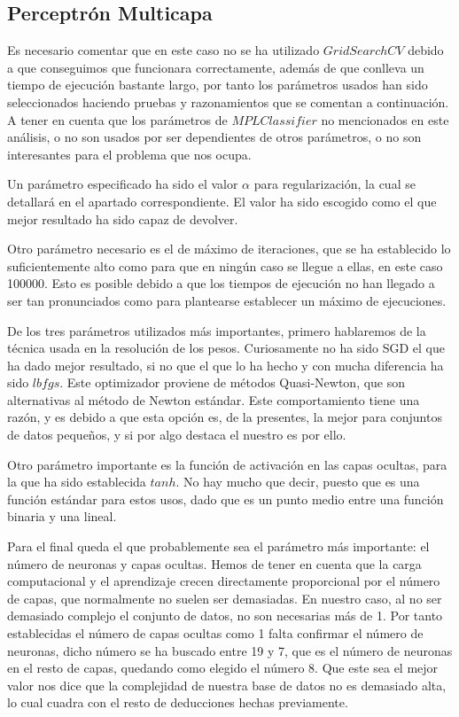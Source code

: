 \documentclass{article}
\begin{document}
	\subsection{Perceptrón Multicapa}
	Es necesario comentar que en este caso no se ha utilizado $GridSearchCV$ debido a que conseguimos que funcionara correctamente, además de que conlleva un tiempo de ejecución bastante largo, por tanto los parámetros usados han sido seleccionados haciendo pruebas y razonamientos que se comentan a continuación. A tener en cuenta que los parámetros de $MPLClassifier$ no mencionados en este análisis, o no son usados por ser dependientes de otros parámetros, o no son interesantes para el problema que nos ocupa.
	\par
	Un parámetro especificado ha sido el valor $\alpha$ para regularización, la cual se detallará en el apartado correspondiente. El valor ha sido escogido como el que mejor resultado ha sido capaz de devolver.
	\par
	Otro parámetro necesario es el de máximo de iteraciones, que se ha establecido lo suficientemente alto como para que en ningún caso se llegue a ellas, en este caso 100000. Esto es posible debido a que los tiempos de ejecución no han llegado a ser tan pronunciados como para plantearse establecer un máximo de ejecuciones.
	\par
	De los tres parámetros utilizados más importantes, primero hablaremos de la técnica usada en la resolución de los pesos. Curiosamente no ha sido SGD el que ha dado mejor resultado, si no que el que lo ha hecho y con mucha diferencia ha sido $lbfgs$. Este optimizador proviene de métodos Quasi-Newton, que son alternativas al método de Newton estándar. Este comportamiento tiene una razón, y es debido a que esta opción es, de la presentes, la mejor para conjuntos de datos pequeños, y si por algo destaca el nuestro es por ello.
	\par
	Otro parámetro importante es la función de activación en las capas ocultas, para la que ha sido establecida $tanh$. No hay mucho que decir, puesto que es una función estándar para estos usos, dado que es un punto medio entre una función binaria y una lineal.
	\par
	Para el final queda el que probablemente sea el parámetro más importante: el número de neuronas y capas ocultas. Hemos de tener en cuenta que la carga computacional y el aprendizaje crecen directamente proporcional por el número de capas, que normalmente no suelen ser demasiadas. En nuestro caso, al no ser demasiado complejo el conjunto de datos, no son necesarias más de 1. Por tanto establecidas el número de capas ocultas como 1 falta confirmar el número de neuronas, dicho número se ha buscado entre 19 y 7, que es el número de neuronas en el resto de capas, quedando como elegido el número 8. Que este sea el mejor valor nos dice que la complejidad de nuestra base de datos no es demasiado alta, lo cual cuadra con el resto de deducciones hechas previamente.
	
\end{document}
